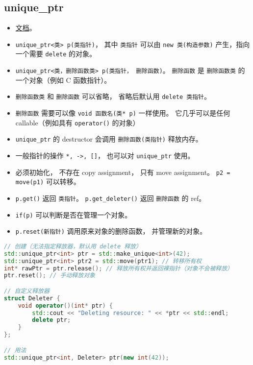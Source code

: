 
\begin{issues}
\issueDraft
\end{issues}

\subsection{unique\_ptr}
\begin{itemize}
\item \href{https://en.cppreference.com/w/cpp/memory/unique_ptr}{文档}。
\item \verb`unique_ptr<类> p(类指针)`， 其中 \verb`类指针` 可以由 \verb`new 类(构造参数)` 产生，指向一个需要 \verb`delete` 的对象。
\item \verb`unique_ptr<类，删除函数类> p(类指针， 删除函数)`。 \verb`删除函数` 是 \verb`删除函数类` 的一个对象（例如 C 函数指针）。
\item \verb`删除函数类` 和 \verb`删除函数` 可以省略， 省略后默认用 \verb`delete 类指针`。
\item \verb`删除函数` 需要可以像 \verb`void 函数名(类* p)` 一样使用。 它几乎可以是任何 callable（例如具有 \verb`operator()` 的对象）
\item \verb`unique_ptr` 的 destructor 会调用 \verb`删除函数(类指针)` 释放内存。
\item 一般指针的操作 \verb`*, ->, []`， 也可以对 \verb`unique_ptr` 使用。
\item 必须初始化， 不存在 copy assignment， 只有 move assignment。 \verb`p2 = move(p1)` 可以转移。
\item \verb`p.get()` 返回 \verb`类指针`。 \verb`p.get_deleter()` 返回 \verb`删除函数` 的 ref。
\item \verb`if(p)` 可以判断是否在管理一个对象。
\item \verb`p.reset(新指针)` 调用原来对象的删除函数， 并管理新的对象。
\end{itemize}
\begin{lstlisting}[language=cpp]
// 创建（无法指定释放器，默认用 delete 释放）
std::unique_ptr<int> ptr = std::make_unique<int>(42);
std::unique_ptr<int> ptr2 = std::move(ptr1); // 转移所有权
int* rawPtr = ptr.release(); // 释放所有权并返回裸指针（对象不会被释放）
ptr.reset(); // 手动释放对象

// 自定义释放器
struct Deleter {
    void operator()(int* ptr) {
        std::cout << "Deleting resource: " << *ptr << std::endl;
        delete ptr;
    }
};

// 用法
std::unique_ptr<int, Deleter> ptr(new int(42));
\end{lstlisting}


